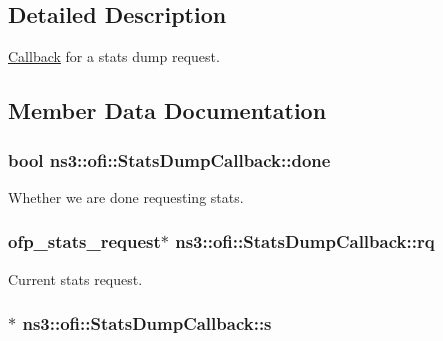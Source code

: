 \subsection{Detailed Description}
\hyperlink{classns3_1_1Callback}{Callback} for a stats dump request. 

\subsection{Member Data Documentation}
\subsubsection[{\texorpdfstring{done}{done}}]{\setlength{\rightskip}{0pt plus 5cm}bool ns3\+::ofi\+::\+Stats\+Dump\+Callback\+::done}\hypertarget{structns3_1_1ofi_1_1StatsDumpCallback_ae9e3cad591886180bc8872baee7e0436}{}\label{structns3_1_1ofi_1_1StatsDumpCallback_ae9e3cad591886180bc8872baee7e0436}


Whether we are done requesting stats. 

\subsubsection[{\texorpdfstring{rq}{rq}}]{\setlength{\rightskip}{0pt plus 5cm}ofp\+\_\+stats\+\_\+request$\ast$ ns3\+::ofi\+::\+Stats\+Dump\+Callback\+::rq}\hypertarget{structns3_1_1ofi_1_1StatsDumpCallback_a1130611e469321c18fcaf36c1fa9caeb}{}\label{structns3_1_1ofi_1_1StatsDumpCallback_a1130611e469321c18fcaf36c1fa9caeb}


Current stats request. 

\subsubsection[{\texorpdfstring{s}{s}}]{$\ast$ ns3\+::ofi\+::\+Stats\+Dump\+Callback\+::s}\hypertarget{structns3_1_1ofi_1_1StatsDumpCallback_a54278de7a5108a7488a20ff48a6b6f29}{}\label{structns3_1_1ofi_1_1StatsDumpCallback_a54278de7a5108a7488a20ff48a6b6f29}


